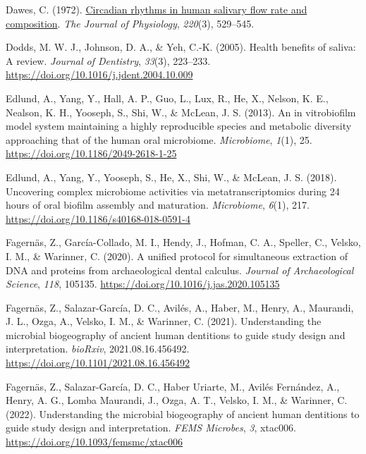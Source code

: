 \documentclass[
  b5paper,
]{book}
\newlength{\cslhangindent}
\newenvironment{CSLReferences}[2] %
 {\begin{list}{}{%
  \setlength{\itemindent}{0pt}
  \setlength{\leftmargin}{0pt}
  \setlength{\parsep}{0pt}
  \ifodd #1
   \setlength{\leftmargin}{\cslhangindent}
   \setlength{\itemindent}{-1\cslhangindent}
  \fi
  \setlength{\itemsep}{#2\baselineskip}}}
 {\end{list}}
\begin{document}
\begin{CSLReferences}{1}{0}
Dawes, C. (1972).
\href{https://www.ncbi.nlm.nih.gov/pmc/articles/PMC1331668}{Circadian
rhythms in human salivary flow rate and composition}. \emph{The Journal
of Physiology}, \emph{220}(3), 529--545.

Dodds, M. W. J., Johnson, D. A., \& Yeh, C.-K. (2005). Health benefits
of saliva: A review. \emph{Journal of Dentistry}, \emph{33}(3),
223--233. \url{https://doi.org/10.1016/j.jdent.2004.10.009}

Edlund, A., Yang, Y., Hall, A. P., Guo, L., Lux, R., He, X., Nelson, K.
E., Nealson, K. H., Yooseph, S., Shi, W., \& McLean, J. S. (2013). An in
vitrobiofilm model system maintaining a highly reproducible species and
metabolic diversity approaching that of the human oral microbiome.
\emph{Microbiome}, \emph{1}(1), 25.
\url{https://doi.org/10.1186/2049-2618-1-25}

Edlund, A., Yang, Y., Yooseph, S., He, X., Shi, W., \& McLean, J. S.
(2018). Uncovering complex microbiome activities via metatranscriptomics
during 24 hours of oral biofilm assembly and maturation.
\emph{Microbiome}, \emph{6}(1), 217.
\url{https://doi.org/10.1186/s40168-018-0591-4}

Fagernäs, Z., García-Collado, M. I., Hendy, J., Hofman, C. A., Speller,
C., Velsko, I. M., \& Warinner, C. (2020). A unified protocol for
simultaneous extraction of {DNA} and proteins from archaeological dental
calculus. \emph{Journal of Archaeological Science}, \emph{118}, 105135.
\url{https://doi.org/10.1016/j.jas.2020.105135}

Fagernäs, Z., Salazar-García, D. C., Avilés, A., Haber, M., Henry, A.,
Maurandi, J. L., Ozga, A., Velsko, I. M., \& Warinner, C. (2021).
Understanding the microbial biogeography of ancient human dentitions to
guide study design and interpretation. \emph{bioRxiv},
2021.08.16.456492. \url{https://doi.org/10.1101/2021.08.16.456492}

Fagernäs, Z., Salazar-García, D. C., Haber Uriarte, M., Avilés
Fernández, A., Henry, A. G., Lomba Maurandi, J., Ozga, A. T., Velsko, I.
M., \& Warinner, C. (2022). Understanding the microbial biogeography of
ancient human dentitions to guide study design and interpretation.
\emph{FEMS Microbes}, \emph{3}, xtac006.
\url{https://doi.org/10.1093/femsmc/xtac006}


\end{CSLReferences}
\end{document}
